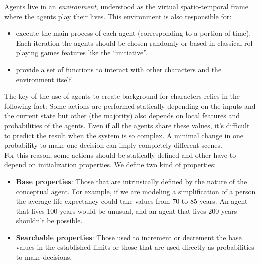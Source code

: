 \documentclass{sig-alternate}
\begin{document}

Agents live in an {\em environment}, understood as the virtual spatio-temporal frame where the agents play their lives. This environment is also responsible for:
\begin{itemize}
\item execute the main process of each agent (corresponding to a portion of time). Each iteration the agents should be chosen randomly or based in classical rol-playing games features like the ``initiative''.
\item provide a set of functions to interact with other characters and the environment itself.
\end{itemize}



The key of the use of agents to create background for characters relies in the following fact: Some actions are performed statically depending on the inputs and the current state but other (the majority) also depends on local features and probabilities of the agents. Even if all the agents share these values, it's difficult to predict the result when the system is so complex. A minimal change in one probability to make one decision can imply completely different scenes.\\

For this reason, some actions should be statically defined and other have to depend on initialization properties. We define two kind of properties:

\begin{itemize}
\item \textbf{Base properties}: Those that are intrinsically defined by the nature of the conceptual agent. For example, if we are modeling a simplification of a person the average life expectancy could take values from 70 to 85 years. An agent that lives 100 years would be unusual, and an agent that lives 200 years shouldn't be possible.
\item \textbf{Searchable properties}: Those used to increment or decrement the base values in the established limits or those that are used directly as probabilities to make decisions.
\end{itemize}

\end{document}
